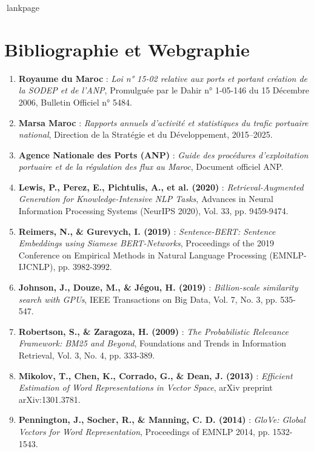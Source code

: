 \documentclass[12pt,a4paper,oneside]{report}
\newcommand{\blankpage}{%
  \newpage
  \thispagestyle{empty}%
  \mbox{}%
  \newpage
}
\begin{document}
lankpage
\blankpage

\chapter*{Bibliographie et Webgraphie}

\begin{enumerate}
    \item \textbf{Royaume du Maroc} : \textit{Loi n° 15-02 relative aux ports et portant création de la SODEP et de l'ANP}, Promulguée par le Dahir n° 1-05-146 du 15 Décembre 2006, Bulletin Officiel n° 5484.
    \item \textbf{Marsa Maroc} : \textit{Rapports annuels d'activité et statistiques du trafic portuaire national}, Direction de la Stratégie et du Développement, 2015–2025.
    \item \textbf{Agence Nationale des Ports (ANP)} : \textit{Guide des procédures d'exploitation portuaire et de la régulation des flux au Maroc}, Document officiel ANP.
    \item \textbf{Lewis, P., Perez, E., Pichtulis, A., et al. (2020)} : \textit{Retrieval-Augmented Generation for Knowledge-Intensive NLP Tasks}, Advances in Neural Information Processing Systems (NeurIPS 2020), Vol. 33, pp. 9459-9474.
    \item \textbf{Reimers, N., \& Gurevych, I. (2019)} : \textit{Sentence-BERT: Sentence Embeddings using Siamese BERT-Networks}, Proceedings of the 2019 Conference on Empirical Methods in Natural Language Processing (EMNLP-IJCNLP), pp. 3982-3992.
    \item \textbf{Johnson, J., Douze, M., \& Jégou, H. (2019)} : \textit{Billion-scale similarity search with GPUs}, IEEE Transactions on Big Data, Vol. 7, No. 3, pp. 535-547.
    \item \textbf{Robertson, S., \& Zaragoza, H. (2009)} : \textit{The Probabilistic Relevance Framework: BM25 and Beyond}, Foundations and Trends in Information Retrieval, Vol. 3, No. 4, pp. 333-389.
    \item \textbf{Mikolov, T., Chen, K., Corrado, G., \& Dean, J. (2013)} : \textit{Efficient Estimation of Word Representations in Vector Space}, arXiv preprint arXiv:1301.3781.
    \item \textbf{Pennington, J., Socher, R., \& Manning, C. D. (2014)} : \textit{GloVe: Global Vectors for Word Representation}, Proceedings of EMNLP 2014, pp. 1532-1543.

\end{enumerate}
\end{document}
